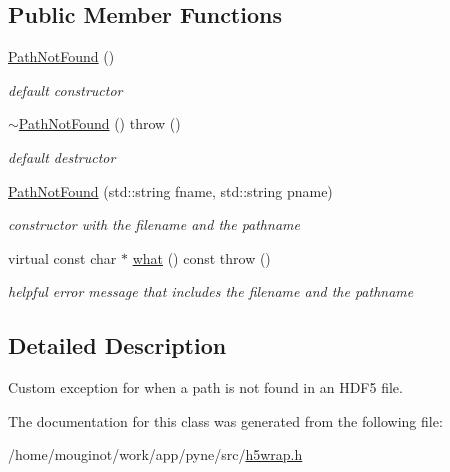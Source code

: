 \subsection*{Public Member Functions}
\begin{DoxyCompactItemize}
\item 
\mbox{\label{classh5wrap_1_1_path_not_found_a7b05229fb4f02920732f22622af1f08e}} 
\hyperlink{classh5wrap_1_1_path_not_found_a7b05229fb4f02920732f22622af1f08e}{Path\+Not\+Found} ()
\begin{DoxyCompactList}\small\item\em default constructor \end{DoxyCompactList}\item 
\mbox{\label{classh5wrap_1_1_path_not_found_acf9696ccdfb4a4c63454dbfc1dcde060}} 
\hyperlink{classh5wrap_1_1_path_not_found_acf9696ccdfb4a4c63454dbfc1dcde060}{$\sim$\+Path\+Not\+Found} ()  throw ()
\begin{DoxyCompactList}\small\item\em default destructor \end{DoxyCompactList}\item 
\mbox{\label{classh5wrap_1_1_path_not_found_aaedd26703acced17206eb8dabd4c5274}} 
\hyperlink{classh5wrap_1_1_path_not_found_aaedd26703acced17206eb8dabd4c5274}{Path\+Not\+Found} (std\+::string fname, std\+::string pname)
\begin{DoxyCompactList}\small\item\em constructor with the filename and the pathname \end{DoxyCompactList}\item 
\mbox{\label{classh5wrap_1_1_path_not_found_abb7e1904e38a063afedcd5f06e7835fd}} 
virtual const char $\ast$ \hyperlink{classh5wrap_1_1_path_not_found_abb7e1904e38a063afedcd5f06e7835fd}{what} () const  throw ()
\begin{DoxyCompactList}\small\item\em helpful error message that includes the filename and the pathname \end{DoxyCompactList}\end{DoxyCompactItemize}


\subsection{Detailed Description}
Custom exception for when a path is not found in an H\+D\+F5 file. 

The documentation for this class was generated from the following file\+:\begin{DoxyCompactItemize}
\item 
/home/mouginot/work/app/pyne/src/\hyperlink{h5wrap_8h}{h5wrap.\+h}\end{DoxyCompactItemize}
